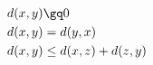 \documentclass[preview]{standalone}
\begin{document}
\begin{align*}
&  d(x,y) \gq 0 \\&  d(x,y)=d(y,x) \\& d(x,y) \leq d(x,z) + d(z,y) \\&
\end{align*}
\end{document}
